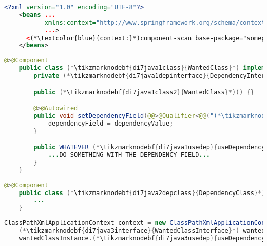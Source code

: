 \begin{lstlisting}[language=XML, title={Configuration XML}]
    <?xml version="1.0" encoding="UTF-8"?>
    <beans ...
           xmlns:context="http://www.springframework.org/schema/context"
           ...>
      <(*\textcolor{blue}{context:}*)component-scan base-package="somepackage.subpackage"/>
    </beans>
\end{lstlisting}
\begin{lstlisting}[language=Java, title={Wanted class with the zero--parameter constructor and the setter method}]
    @>@Component
    public class (*\tikzmarknodebf{di7java1class}{WantedClass}*) implements (*\tikzmarknodebf{di7java1interface}{WantedClassInterface}*) {
        private (*\tikzmarknodebf{di7java1depinterface}{DependencyInterface}*) dependencyField;

        public (*\tikzmarknodebf{di7java1class2}{WantedClass}*)() {}

        @>@Autowired
        public void setDependencyField(@@>@Qualifier<@@("(*\tikzmarknodebf{di7java1depbeanid}{dependencyClass}[ForestGreen]*)") (*\tikzmarknodebf{di7java1depinterface2}{DependencyInterface}*) dependencyValue) {
            dependencyField = dependencyValue;
        }

        public WHATEVER (*\tikzmarknodebf{di7java1usedep}{useDependency}*)() {
            ...DO SOMETHING WITH THE DEPENDENCY FIELD...
        }
    }
\end{lstlisting}
\begin{lstlisting}[language=Java, title={Dependency class}]
    @>@Component
    public class (*\tikzmarknodebf{di7java2depclass}{DependencyClass}*) implements (*\tikzmarknodebf{di7java2depinterface}{DependencyInterface}*) {
        ...
    }
\end{lstlisting}
\begin{lstlisting}[language=Java, title={Usage}]
    ClassPathXmlApplicationContext context = new ClassPathXmlApplicationContext("configurationFile.xml");
    (*\tikzmarknodebf{di7java3interface}{WantedClassInterface}*) wantedClassInstance = context.getBean("(*\tikzmarknodebf{di7java3beanid}{wantedClass}[ForestGreen]*)", (*\tikzmarknodebf{di7java3interface2}{WantedClassInterface}*).class);
    wantedClassInstance.(*\tikzmarknodebf{di7java3usedep}{useDependency}*)();
\end{lstlisting}
\newpage

